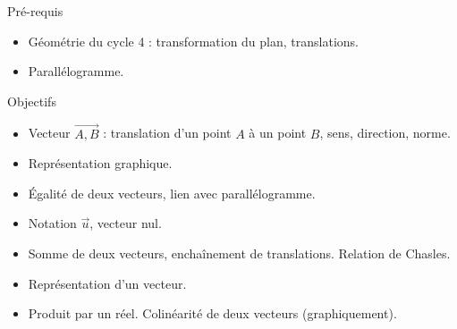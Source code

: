 \documentclass{article}
\theoremstyle{definition}
\begin{document}
\pagestyle{fancy}

\fancyhf{} %
\fancyhead[L]{\large \textbf{\Niveau}}
\fancyhead[C]{\large \textbf{\Chapitre}}

\large

\begin{paragraph}{Pré-requis}
  \begin{itemize}
    \item Géométrie du cycle 4 : transformation du plan, translations.
    \item Parallélogramme.
  \end{itemize}
\end{paragraph}

\begin{paragraph}{Objectifs}
  \begin{itemize}
    \item Vecteur $\overrightarrow{A,B}$ : translation d'un point $A$ à un point $B$, sens, direction, norme.
    \item Représentation graphique.
    \item Égalité de deux vecteurs, lien avec parallélogramme.
    \item Notation $\overrightarrow{u}$, vecteur nul.
    \item Somme de deux vecteurs, enchaînement de translations. Relation de Chasles.
    \item Représentation d'un vecteur.
    \item Produit par un réel. Colinéarité de deux vecteurs (graphiquement).
  \end{itemize} 
\end{paragraph}
\end{document}

